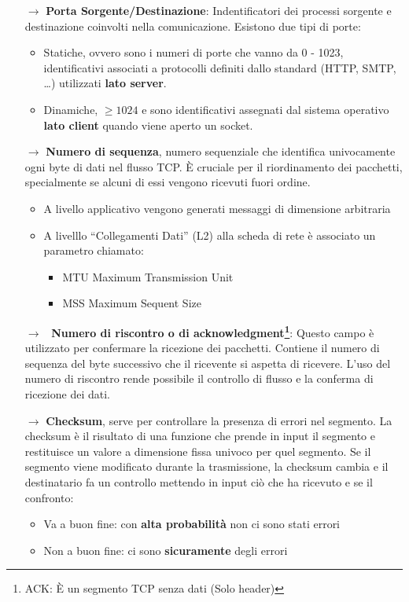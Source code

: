 \documentclass[a4paper]{article}
\begin{document}
\begin{itemize}
	\item[$\rightarrow$] \textbf{Porta Sorgente/Destinazione}: Indentificatori dei processi sorgente e destinazione coinvolti nella comunicazione. Esistono due tipi di porte:
	\begin{itemize}
		\item Statiche, ovvero sono i numeri di porte che vanno da 0 - 1023, identificativi associati a protocolli definiti dallo standard (HTTP, SMTP, \dots) utilizzati \textbf{lato server}.
		\item Dinamiche, $\ge 1024$ e sono identificativi assegnati dal sistema operativo \textbf{lato client} quando viene aperto un socket.
\end{itemize}

\item[$\rightarrow$]\textbf{Numero di sequenza}, numero sequenziale che identifica univocamente ogni byte di dati nel flusso TCP.
È cruciale per il riordinamento dei pacchetti, specialmente se alcuni di essi vengono ricevuti fuori ordine.		
\begin{itemize}
		\item A livello applicativo vengono generati messaggi di dimensione arbitraria
		\item A livelllo ``Collegamenti Dati'' (L2) alla scheda di rete è associato un parametro chiamato:
			\begin{itemize}
				\item MTU Maximum Transmission Unit
				\item MSS Maximum Sequent Size
			\end{itemize}
	\end{itemize}
\item[$\rightarrow$] \textbf{Numero di riscontro o di acknowledgment\footnote{ACK: È un segmento TCP senza dati (Solo header)}}: Questo campo è utilizzato per confermare la ricezione dei pacchetti. Contiene il numero di sequenza del byte successivo che il ricevente si aspetta di ricevere.
L'uso del numero di riscontro rende possibile il controllo di flusso e la conferma di ricezione dei dati.
\item[$\rightarrow$] \textbf{Checksum}, 
serve per controllare la presenza di errori nel segmento. La checksum è 
il risultato di una funzione che prende in input il 
segmento e restituisce un valore a dimensione fissa 
univoco per quel segmento. Se il segmento viene modificato 
durante la trasmissione, la checksum cambia e il destinatario fa 
un controllo mettendo in input ciò che ha ricevuto e se il confronto:
\begin{itemize}
  \item Va a buon fine: con \textbf{alta probabilità} non ci sono stati errori
  \item Non a buon fine: ci sono \textbf{sicuramente} degli errori
\end{itemize}

\end{itemize}
\end{document}
